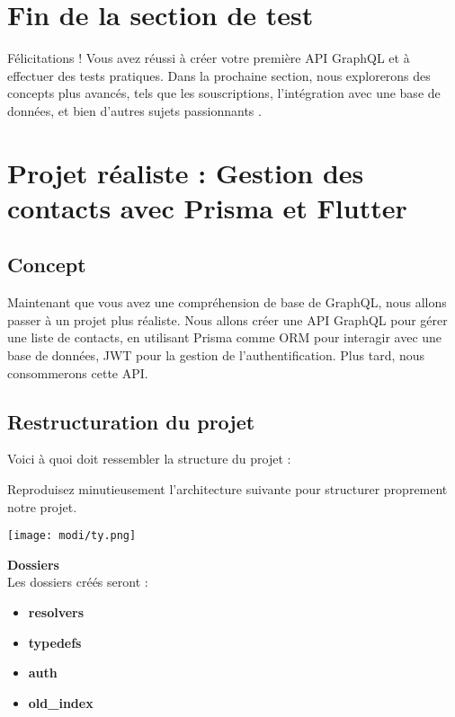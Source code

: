 \documentclass{article}
\begin{document}
\section{Fin de la section de test} Félicitations ! \faTrophy Vous avez réussi à créer votre première API GraphQL et à effectuer des tests pratiques. Dans la prochaine section, nous explorerons des concepts plus avancés, tels que les souscriptions, l'intégration avec une base de données, et bien d'autres sujets passionnants \faSmileO.


\section{Projet réaliste : Gestion des contacts avec Prisma et Flutter}
\subsection{Concept}
Maintenant que vous avez une compréhension de base de GraphQL, nous allons passer à un projet plus réaliste. Nous allons créer une API GraphQL pour gérer une liste de contacts, en utilisant Prisma comme ORM pour interagir avec une base de données,  JWT pour la gestion de l'authentification. Plus tard, nous consommerons cette API.

\subsection{Restructuration du projet  \faFolder\  }


Voici à quoi doit ressembler la structure du projet :


\noindent
Reproduisez minutieusement l'architecture suivante pour structurer proprement notre projet.

\vspace{0.5cm}
\begin{center}
    \texttt{[image: modi/ty.png]}
\end{center}

\noindent
\textbf{\faFolder Dossiers } \\
Les dossiers créés  seront  :
\begin{itemize}
    \item \textbf{resolvers}
    \item \textbf{typedefs}
    \item \textbf{auth}
    \item \textbf{old\_index}
\end{itemize}
\end{document}
